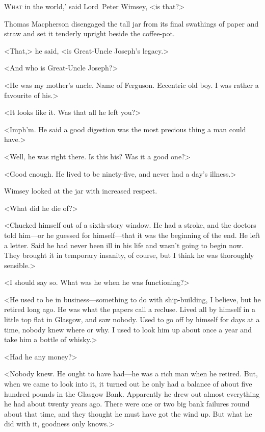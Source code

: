 
\lettrine[ante=‘]{W}{hat} in the world,' said Lord~Peter Wimsey, <is that?>

\zz
Thomas Macpherson disengaged the tall jar from its final swathings of paper and straw and set it tenderly upright beside the coffee-pot.

<That,> he said, <is Great-Uncle Joseph's legacy.>

<And who is Great-Uncle Joseph?>

<He was my mother's uncle. Name of Ferguson. Eccentric old boy. I was rather a favourite of his.>

<It looks like it. Was that all he left you?>

<Imph'm. He said a good digestion was the most precious thing a man could have.>

<Well, he was right there. Is this his? Was it a good one?>

<Good enough. He lived to be ninety-five, and never had a day's illness.>

Wimsey looked at the jar with increased respect.

<What did he die of?>

<Chucked himself out of a sixth-story window. He had a stroke, and the doctors told him—or he guessed for himself—that it was the beginning of the end. He left a letter. Said he had never been ill in his life and wasn't going to begin now. They brought it in temporary insanity, of course, but I think he was thoroughly sensible.>

<I should say so. What was he when he was functioning?>

<He used to be in business—something to do with ship-building, I believe, but he retired long ago. He was what the papers call a recluse. Lived all by himself in a little top flat in Glasgow, and saw nobody. Used to go off by himself for days at a time, nobody knew where or why. I used to look him up about once a year and take him a bottle of whisky.>

<Had he any money?>

<Nobody knew. He ought to have had—he was a rich man when he retired. But, when we came to look into it, it turned out he only had a balance of about five hundred pounds in the Glasgow Bank. Apparently he drew out almost everything he had about twenty years ago. There were one or two big bank failures round about that time, and they thought he must have got the wind up. But what he did with it, goodness only knows.>

